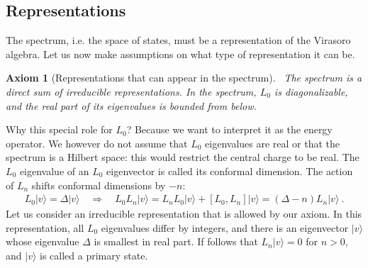\documentclass[12pt, a4paper]{article}
\theoremstyle{break}
\newtheorem{hyp}[exo]{Axiom}
\begin{document}
\subsection{Representations}

The spectrum, i.e. the space of states, must be a representation of the Virasoro algebra. Let us now make assumptions on what type of representation it can be.

\begin{hyp}[Representations that can appear in the spectrum]
 ~\label{hyp:rep}
 The spectrum is a direct sum of irreducible representations. In the spectrum, $L_0$ is diagonalizable, and the real part of its eigenvalues is bounded from below.
\end{hyp}
Why this special role for $L_0$? Because we want to interpret it as the energy operator. 
We however do not assume that $L_0$ eigenvalues are real or that the spectrum is a Hilbert space: this would restrict the central charge to be real. The $L_0$ eigenvalue of an $L_0$ eigenvector is called its conformal dimension. The action of $L_n$ shifts conformal dimensions by $-n$:
\begin{align}
 L_0|v\rangle = \Delta|v\rangle \quad \Rightarrow\quad  L_0 L_n|v\rangle = L_nL_0|v\rangle + [L_0, L_n] |v\rangle  = (\Delta-n)L_n|v\rangle \ .
\end{align}
Let us consider an irreducible representation that is allowed by our axiom. In this representation, all $L_0$ eigenvalues differ by integers, and there is an eigenvector $|v\rangle$ whose eigenvalue $\Delta$ is smallest in real part. 
If follows that $L_n|v\rangle =0$ for $n>0$, and $|v\rangle $ is called a primary state.
\end{document}

